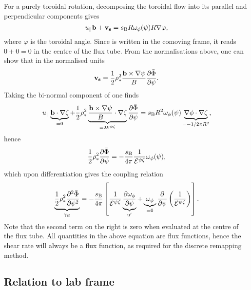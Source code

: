 For a purely toroidal rotation, decomposing the toroidal flow into its parallel and perpendicular components gives
\begin{equation}
u_\parallel \mathbf{b} +  \mathbf{v_s} = s_{\rm B} R \omega_\phi(\psi) R \nabla \varphi,
\label{eq:toroidal}
\end{equation}
where $\varphi$ is the toroidal angle. Since  is written in the comoving frame,
 it reads $0+0=0$ in the centre of the flux tube.
From the normalisations above, one can show that in the normalised units
\begin{equation}
 \mathbf{v_s} = {1 \over 2} \rho_*^2 {\mathbf{b} \times \nabla \psi \over
B} {\partial \bar{\Phi} \over \partial \psi}.
\end{equation}
Taking the bi-normal component of  one finds
\begin{equation}
 u_{\parallel} \underbrace{\mathbf{b} \cdot \nabla \zeta}_{=0} +  {1 \over 2}
\rho_*^2 \underbrace{{\mathbf{b} \times \nabla \psi \over B}\cdot \nabla
	\zeta}_{=2\mathcal{E}^{\psi \zeta}}{\partial \bar{\Phi} \over \partial \psi} = s_{\rm B} R^2 \omega_{\phi}(\psi)
\underbrace{\nabla \phi \cdot \nabla \zeta}_{=-1/2\pi R^2},
\end{equation}
hence
\begin{equation}
 {1 \over 2} \rho_*^2 {\partial \bar{\Phi} \over \partial \psi} = - {s_{\rm B} \over 4 \pi}{1 \over
\mathcal{E}^{\psi \zeta}}\omega_{\phi}(\psi),
\label{eq:comoving}
\end{equation}
which upon differentiation gives the coupling relation
\begin{equation}
 \underbrace{{1 \over 2} \rho_*^2 {\partial^2 \bar{\Phi} \over \partial \psi^2}}_{\gamma_E} = - {s_{\rm B} \over 4 \pi}\left[{1 \over
\mathcal{E}^{\psi \zeta}}\underbrace{\partial \omega_{\phi} \over \partial \psi}_{\rm u^\prime} +
\underbrace{\omega_\phi}_{=0}{\partial \over \partial \psi} \left({1 \over \mathcal{E}^{\psi \zeta}}\right)\right].
\label{eq:coupling}
\end{equation}
Note that the second term on the right is zero when evaluated at the centre of the flux tube.
All quantities in the above equation are flux functions, hence the shear rate will always be a
flux function, as required for the discrete remapping method.


\subsection{Relation to lab frame}

